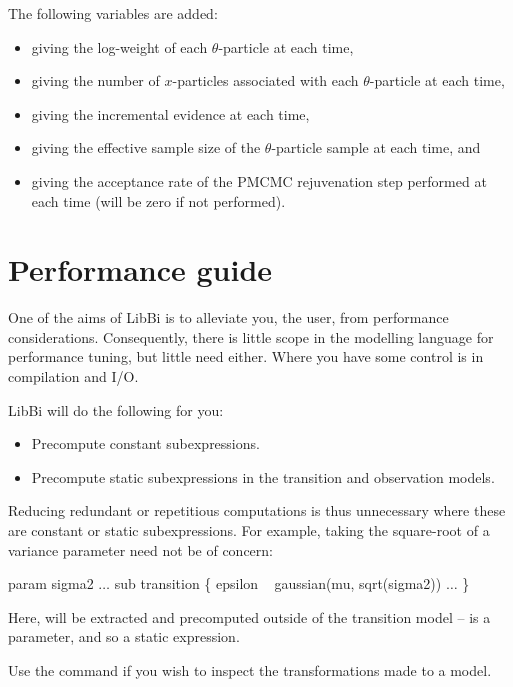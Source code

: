 The following variables are added:
\begin{itemize}
\item {} giving the log-weight of each $\theta$-particle
  at each time,
\item {} giving the number of $x$-particles associated with
  each $\theta$-particle at each time,
\item {} giving the incremental evidence at each time,
\item {} giving the effective sample size of the $\theta$-particle
  sample at each time, and
\item {} giving the acceptance rate of the PMCMC
  rejuvenation step performed at each time (will be zero if not performed).
\end{itemize}

\section{Performance guide\label{Performance guide}}

One of the aims of LibBi is to alleviate you, the user, from performance
considerations. Consequently, there is little scope in the modelling language
for performance tuning, but little need either. Where you have some control is
in compilation and I/O.

LibBi will do the following for you:
\begin{itemize}
\item Precompute constant subexpressions.
\item Precompute static subexpressions in the transition and observation
  models.
\end{itemize}

Reducing redundant or repetitious computations is thus unnecessary where these
are constant or static subexpressions. For example, taking the square-root of
a variance parameter need not be of concern:
\begin{bicode}
param sigma2
\(\ldots\)
sub transition \{
    epsilon ~ gaussian(mu, sqrt(sigma2))
    \(\ldots\)
\}
\end{bicode}
Here,  will be extracted and precomputed outside of the
transition model --  is a parameter, and so
 a static expression.

Use the  command if you wish to inspect the transformations
made to a model.

